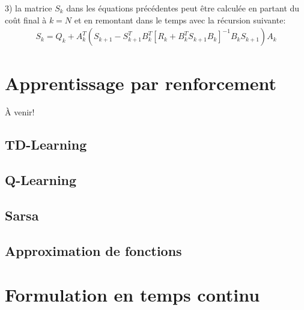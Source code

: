 3) la matrice $S_k$ dans les équations précédentes peut être calculée en partant du coût final à $k=N$ et en remontant dans le temps avec la récursion suivante:
\begin{align}
    S_k = Q_k + A_k^T \left( S_{k+1} - S_{k+1}^T B_k^T  \left[ R_k + B_k^T S_{k+1} B_k \right]^{-1} B_k S_{k+1} \right) A_k
\end{align}




\newpage
\section{Apprentissage par renforcement}


À venir!


\subsection{TD-Learning}

\subsection{Q-Learning}

\subsection{Sarsa}


\subsection{Approximation de fonctions}





\newpage
\section{Formulation en temps continu}
\label{sec:dp_cont}

